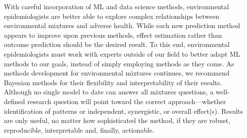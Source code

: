 With careful incorporation of ML and data science methods, environmental epidemiologists are better able to explore complex relationships between environmental mixtures and adverse health. While each new prediction method appears to improve upon previous methods, effect estimation rather than outcome prediction should be the desired result. To this end, environmental epidemiologists must work with experts outside of our field to better adapt ML methods to our goals, instead of simply employing methods as they come. As methods development for environmental mixtures continues, we recommend Bayesian methods for their flexibility and interpretability of their results. Although no single model to date can answer all mixtures questions, a well-defined research question will point toward the correct approach---whether identification of patterns or independent, synergistic, or overall effect(s). Results are only useful, no matter how sophisticated the method, if they are robust, reproducible, interpretable and, finally, actionable. 

\clearpage
